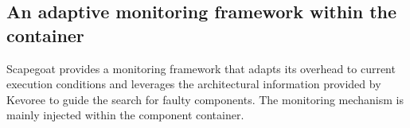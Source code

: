 %

\subsection{An adaptive monitoring framework within the container} \label{monitorContainer}


Scapegoat provides a monitoring framework that adapts its overhead to current execution conditions and leverages the architectural information provided by Kevoree to guide the search for faulty components.
The monitoring mechanism is mainly injected within the component container. 

